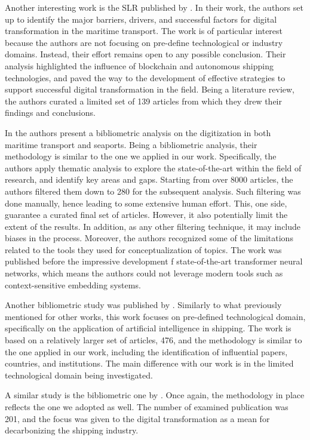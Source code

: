 \documentclass[a4paper, review, endfloat, doubleblind, authoryear]{elsarticle}
\begin{document}
	Another interesting work is the SLR published by \citep{tijan2021digital}. In their work, the authors set up to identify the major barriers, drivers, and successful factors for digital transformation in the maritime transport. The work is of particular interest because the authors are not focusing on pre-define technological or industry domains. Instead, their effort remains open to any possible conclusion. Their analysis highlighted the influence of blockchain and autonomous shipping technologies, and paved the way to the development of effective strategies to support successful digital transformation in the field. Being a literature review, the authors curated a limited set of 139 articles from which they drew their findings and conclusions.
	
	In \citep{jovic2022digitalization} the authors present a bibliometric analysis on the digitization in both maritime transport and seaports. Being a bibliometric analysis, their methodology is similar to the one we applied in our work. Specifically, the authors apply thematic analysis to explore the state-of-the-art within the field of research, and identify key areas and gaps. Starting from over 8000 articles, the authors filtered them down to 280 for the subsequent analysis. Such filtering was done manually, hence leading to some extensive human effort. This, one side, guarantee a curated final set of articles. However, it also potentially limit the extent of the results. In addition, as any other filtering technique, it may include biases in the process. Moreover, the authors recognized some of the limitations related to the tools they used for conceptualization of topics. The work was published before the impressive development f state-of-the-art transformer neural networks, which means the authors could not leverage modern tools such as context-sensitive embedding systems.
	
	Another bibliometric study was published by \citep{xiao2024application}. Similarly to what previously mentioned for other works, this work focuses on pre-defined technological domain, specifically on the application of artificial intelligence in shipping. The work is based on a relatively larger set of articles, 476, and the methodology is similar to the one applied in our work, including the identification of influential papers, countries, and institutions. The main difference with our work is in the limited technological domain being investigated.
	
	A similar study is the bibliometric one by \citep{xiao2025application}. Once again, the methodology in place reflects the one we adopted as well. The number of examined publication was 201, and the focus was given to the digital transformation as a mean for decarbonizing the shipping industry.
	
\end{document}
